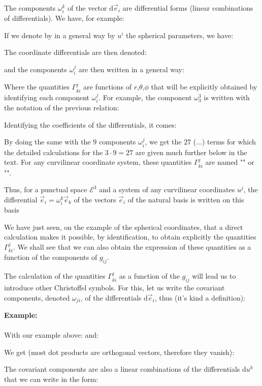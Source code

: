 	The components $\omega_i^k$ of the vector $\mathrm{d}\vec{e}_i$ are differential forms (linear combinations of differentials). We have, for example:
	
	If we denote by in a general way by $u^i$ the spherical parameters, we have:
	
	The coordinate differentials are then denoted:
	
	and the components $\omega_i^j$ are then written in a general way:
	
	Where the quantities $\Gamma_{ki}^j$ are functions of $r$,$\theta$,$\phi$ that will be explicitly obtained by identifying each component $\omega_i^j$. For example, the component $\omega_3^3$ is written with the notation of the previous relation:
	
	Identifying the coefficients of the differentials, it comes:
	
	By doing the same with the $9$ components $\omega_i^j$, we get the $27$ (...) terms for which the detailed calculations for the $3\cdot 9=27$ are given much further below in the text. For any curvilinear coordinate system, these quantities $\Gamma_{ki}^j$ are named "" or "".
	
	Thus, for a punctual space $\mathcal{E}^3$ and a system of any curvilinear coordinates $u^j$, the differential $\mathrm{}\vec{e}_i=\omega_i^k\vec{e}_k$ of the vectors $\vec{e}_i$ of the natural basis is written on this basis
	
	We have just seen, on the example of the spherical coordinates, that a direct calculation makes it possible, by identification, to obtain explicitly the quantities $\Gamma_{ki}^j$. We shall see that we can also obtain the expression of these quantities as a function of the components of $g_{ij}$.
	
	The calculation of the quantities $\Gamma_{ki}^j$ as a function of the $g_{ij}$ will lead us to introduce other Christoffel symbols. For this, let us write the covariant components, denoted $\omega_{ji}$, of the differentials $\mathrm{d}\vec{e}_i$, thus (it's kind a definition):
	
	\begin{tcolorbox}[colframe=black,colback=white,sharp corners]
	\textbf{{\Large {}}Example:}\\\\
	With our example above:
	and:
	
	We get (most dot products are orthogonal vectors, therefore they vanish):
	
	\end{tcolorbox}
	The covariant components are also a linear combinations of the  differentials $\mathrm{d}u^k$ that we can write in the form:
	
